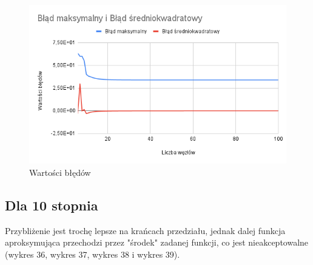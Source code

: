 \documentclass{article}
\begin{document}
\begin{figure}[H]
  \centering
  \begin{minipage}[b]{0.4\textwidth}
    \includegraphics[width=\textwidth]{img35.png}
    \caption{Wartości błędów}
  \end{minipage}
\end{figure}

\subsection{Dla 10 stopnia}

Przybliżenie jest trochę lepsze na krańcach przedziału, jednak dalej funkcja aproksymująca przechodzi przez "środek" zadanej funkcji, co jest nieakceptowalne (wykres 36, wykres 37, wykres 38 i wykres 39).
\end{document}
